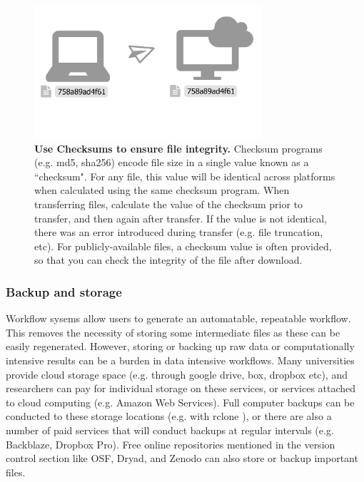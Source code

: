 \documentclass[10pt,letterpaper]{article}
\begin{document}
\begin{figure}
\centering
\includegraphics[width=0.75\textwidth]{figures/checksum.pdf}
\caption{\textbf{Use Checksums to ensure file integrity.} Checksum programs (e.g. md5, sha256) encode file size in a single value known as a ``checksum".
For any file, this value will be identical across platforms when calculated using the same checksum program. %
When transferring files, calculate the value of the checksum prior to transfer, and then again after transfer.
If the value is not identical, there was an error introduced during transfer (e.g. file truncation, etc).
For publicly-available files, a checksum value is often provided, so that you can check the integrity of the file after download.
 } 
\label{fig:checksum}
\end{figure}

\subsubsection*{Backup and storage} 

Workflow sysems allow users to generate an automatable, repeatable workflow.
This removes the necessity of storing some intermediate files as these can be easily regenerated.
However, storing or backing up raw data or computationally intensive results can be a burden in data intensive workflows.
Many universities provide cloud storage space (e.g. through google drive, box, dropbox etc), and researchers can pay for individual storage on these services, or services attached to cloud computing (e.g. Amazon Web Services). 
Full computer backups can be conducted to these storage locations (e.g. with rclone \cite{bailleul2016rclone}), or there are also a number of paid services that will conduct backups at regular intervals (e.g. Backblaze, Dropbox Pro). 
Free online repositories mentioned in the version control section like OSF, Dryad, and Zenodo can also store or backup important files. 
\end{document}
